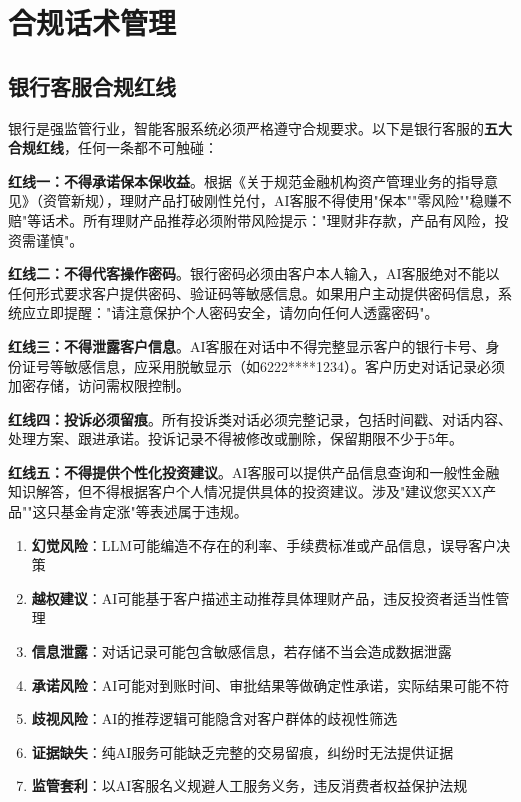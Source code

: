 \section{合规话术管理}

\subsection{银行客服合规红线}

银行是强监管行业，智能客服系统必须严格遵守合规要求。以下是银行客服的\textbf{五大合规红线}，任何一条都不可触碰：

\textbf{红线一：不得承诺保本保收益}。根据《关于规范金融机构资产管理业务的指导意见》（资管新规），理财产品打破刚性兑付，AI客服不得使用"保本""零风险""稳赚不赔"等话术。所有理财产品推荐必须附带风险提示："理财非存款，产品有风险，投资需谨慎"。

\textbf{红线二：不得代客操作密码}。银行密码必须由客户本人输入，AI客服绝对不能以任何形式要求客户提供密码、验证码等敏感信息。如果用户主动提供密码信息，系统应立即提醒："请注意保护个人密码安全，请勿向任何人透露密码"。

\textbf{红线三：不得泄露客户信息}。AI客服在对话中不得完整显示客户的银行卡号、身份证号等敏感信息，应采用脱敏显示（如6222****1234）。客户历史对话记录必须加密存储，访问需权限控制。

\textbf{红线四：投诉必须留痕}。所有投诉类对话必须完整记录，包括时间戳、对话内容、处理方案、跟进承诺。投诉记录不得被修改或删除，保留期限不少于5年。

\textbf{红线五：不得提供个性化投资建议}。AI客服可以提供产品信息查询和一般性金融知识解答，但不得根据客户个人情况提供具体的投资建议。涉及"建议您买XX产品""这只基金肯定涨"等表述属于违规。

\begin{warningbox}[AI客服可能触发的合规风险清单]
\begin{enumerate}[leftmargin=2em]
  \item \textbf{幻觉风险}：LLM可能编造不存在的利率、手续费标准或产品信息，误导客户决策
  \item \textbf{越权建议}：AI可能基于客户描述主动推荐具体理财产品，违反投资者适当性管理
  \item \textbf{信息泄露}：对话记录可能包含敏感信息，若存储不当会造成数据泄露
  \item \textbf{承诺风险}：AI可能对到账时间、审批结果等做确定性承诺，实际结果可能不符
  \item \textbf{歧视风险}：AI的推荐逻辑可能隐含对客户群体的歧视性筛选
  \item \textbf{证据缺失}：纯AI服务可能缺乏完整的交易留痕，纠纷时无法提供证据
  \item \textbf{监管套利}：以AI客服名义规避人工服务义务，违反消费者权益保护法规
\end{enumerate}
\end{warningbox}

